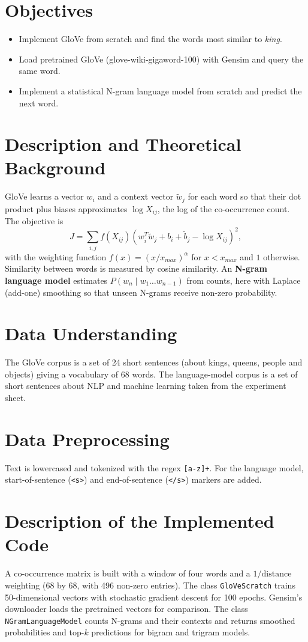\documentclass[12pt,a4paper,oneside]{report}
\begin{document}
\section{Objectives}
\begin{itemize}
\item Implement GloVe from scratch and find the words most similar to \emph{king}.
\item Load pretrained GloVe (glove-wiki-gigaword-100) with Gensim and query the same word.
\item Implement a statistical N-gram language model from scratch and predict the next word.
\end{itemize}

\section{Description and Theoretical Background}
GloVe learns a vector \(w_i\) and a context vector \(\tilde w_j\) for each word so that their dot product plus biases approximates \(\log X_{ij}\), the log of the co-occurrence count. The objective is
\[J=\sum_{i,j} f(X_{ij})\left(w_i^T\tilde w_j+b_i+\tilde b_j-\log X_{ij}\right)^2,\]
with the weighting function \(f(x)=(x/x_{max})^{\alpha}\) for \(x<x_{max}\) and \(1\) otherwise. Similarity between words is measured by cosine similarity. An \textbf{N-gram language model} estimates \(P(w_n\mid w_1\dots w_{n-1})\) from counts, here with Laplace (add-one) smoothing so that unseen N-grams receive non-zero probability.


\section{Data Understanding}
The GloVe corpus is a set of 24 short sentences (about kings, queens, people and objects) giving a vocabulary of 68 words. The language-model corpus is a set of short sentences about NLP and machine learning taken from the experiment sheet.


\section{Data Preprocessing}
Text is lowercased and tokenized with the regex \texttt{{[}a-z{]}+}. For the language model, start-of-sentence (\texttt{<s>}) and end-of-sentence (\texttt{</s>}) markers are added.


\section{Description of the Implemented Code}
A co-occurrence matrix is built with a window of four words and a \(1/\text{distance}\) weighting (68 by 68, with 496 non-zero entries). The class \texttt{GloVeScratch} trains 50-dimensional vectors with stochastic gradient descent for 100 epochs. Gensim's downloader loads the pretrained vectors for comparison. The class \texttt{NGramLanguageModel} counts N-grams and their contexts and returns smoothed probabilities and top-\(k\) predictions for bigram and trigram models.
\end{document}
